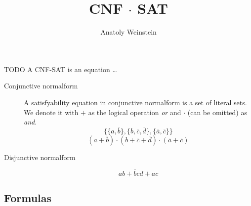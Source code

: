 \documentclass[12pt, letterpaper]{article}
\title{CNF $\cdot$ SAT}
\author{Anatoly Weinstein}
\begin{document}
    \maketitle

    TODO A CNF-SAT is an equation \ldots




    \begin{description}

    \item[Conjunctive normalform]
    
    A satisfyability equation in conjunctive
    normalform is a set of literal sets. We
    denote it with $+$ as the logical operation
    \emph{or} and $\cdot$ (can be omitted) as
    \emph{and}.
    \[\{\{a, \overline b\}, \{b, \overline c, \overline d\}, \{\overline a, \overline c\}\}\]
    \[(a+\overline b) \cdot (b +\overline c +\overline d) \cdot (\overline a +\overline c)\]

    \item[Disjunctive normalform]
    
    \[ab + \overline bcd + ac\]

    \end{description}

    \subsection*{Formulas}
\end{document}
